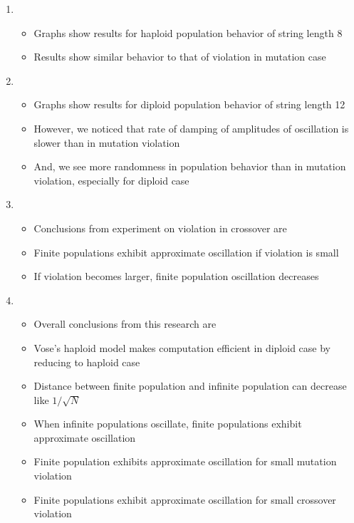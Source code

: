 \documentclass{article}
\begin{document}
\begin{enumerate}
\item
  \begin{itemize}
  \item Graphs show results for haploid population behavior of string length 8
  \item Results show similar behavior to that of violation in mutation case
  \end{itemize}
  
\item 
  \begin{itemize}
  \item Graphs show results for diploid population behavior of string length 12
  \item However, we noticed that rate of damping of amplitudes of oscillation is slower than in mutation violation  
  \item And, we see more randomness in population behavior than in mutation violation, especially for diploid case
  \end{itemize}
  
\item
  \begin{itemize}
  \item Conclusions from experiment on violation in crossover are 
  \item Finite populations exhibit approximate oscillation if violation is small
  \item If violation becomes larger, finite population oscillation decreases
  \end{itemize}
  
\item
  \begin{itemize}
  \item Overall conclusions from this research are
  \item Vose's haploid model makes computation efficient in diploid case by reducing to haploid case 
  \item Distance between finite population and infinite population can decrease like $1/\sqrt{N}$
  \item When infinite populations oscillate, finite populations exhibit approximate oscillation
  \item Finite population exhibits approximate oscillation for small mutation violation
  \item Finite populations exhibit approximate oscillation for small crossover violation      
  
  \end{itemize}
  

\end{enumerate}
\end{document}
